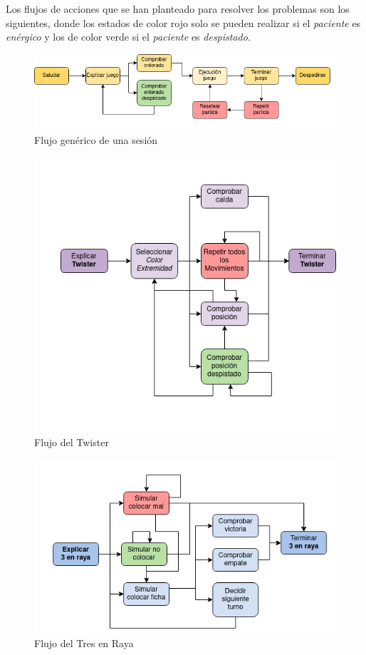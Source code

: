 \documentclass{uc3mpracticas}
\begin{document}
  \vspace{2mm}

  Los flujos de acciones que se han planteado para resolver los problemas son los siguientes, donde los estados de color rojo solo se pueden realizar si el \textit{paciente} es \textit{enérgico} y los de color verde si el \textit{paciente} es \textit{despistado}.

  \begin{figure}[!h]
    \centering
    \includegraphics[width=.75\linewidth]{Images/flujo_sesion1.png}
    \caption*{Flujo genérico de una sesión}
  \end{figure}

  \begin{figure}[!h]
    \centering
    \includegraphics[width=.75\linewidth]{Images/flujo_sesion2.png}
    \caption*{Flujo del Twister}
  \end{figure}

  \begin{figure}[!h]
    \centering
    \includegraphics[width=.75\linewidth]{Images/flujo_sesion3.png}
    \caption*{Flujo del Tres en Raya}
  \end{figure}
\end{document}
